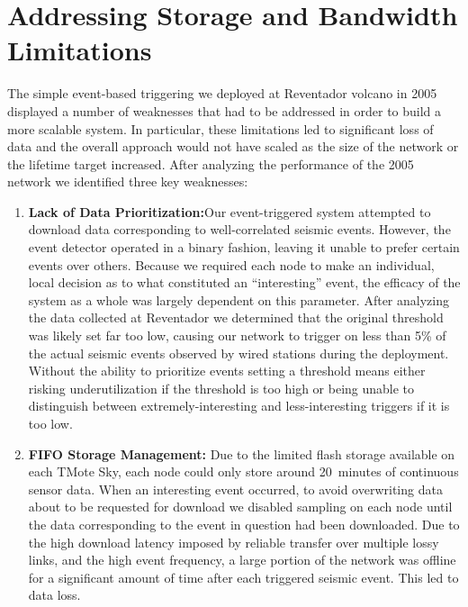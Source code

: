 \section{Addressing Storage and Bandwidth Limitations}
\label{sec-prioritylance}

The simple event-based triggering we deployed at Reventador volcano in 2005
displayed a number of weaknesses that had to be addressed in order to build a
more scalable system.  In particular, these limitations led to significant
loss of data and the overall approach would not have scaled as the size of
the network or the lifetime target increased.  After analyzing the
performance of the 2005 network we identified three key weaknesses:

\begin{enumerate}
\item \textbf{Lack of Data Prioritization:}Our event-triggered system
attempted to download data corresponding to well-correlated seismic events.
However, the event detector operated in a binary fashion, leaving it unable
to prefer certain events over others.  Because we required each node to make
an individual, local decision as to what constituted an ``interesting''
event, the efficacy of the system as a whole was largely dependent on this
parameter. After analyzing the data collected at Reventador we determined
that the original threshold was likely set far too low, causing our network
to trigger on less than 5\% of the actual seismic events observed by wired
stations during the deployment. Without the ability to prioritize events
setting a threshold means either risking underutilization if the threshold is
too high or being unable to distinguish between extremely-interesting and
less-interesting triggers if it is too low.

\item \textbf{FIFO Storage Management:} Due to the limited flash storage
available on each TMote Sky, each node could only store around 20~minutes of
continuous sensor data.  When an interesting event occurred, to avoid
overwriting data about to be requested for download we disabled sampling on
each node until the data corresponding to the event in question had been
downloaded.  Due to the high download latency imposed by reliable transfer
over multiple lossy links, and the high event frequency, a large portion of
the network was offline for a significant amount of time after each triggered
seismic event. This led to data loss.


\end{enumerate}
